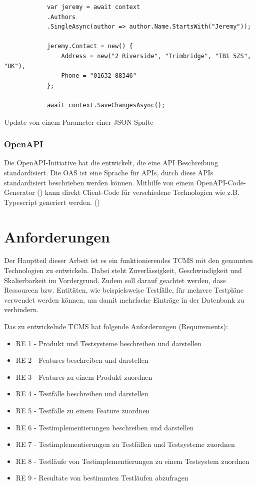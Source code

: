 \documentclass[a4paper, fontsize=11pt, parskip=half, twoside]{scrreprt}
\begin{document}
	\begin{listing}[ht]
		\begin{verbatim}
			var jeremy = await context
			.Authors
			.SingleAsync(author => author.Name.StartsWith("Jeremy"));
			
			jeremy.Contact = new() { 
				Address = new("2 Riverside", "Trimbridge", "TB1 5ZS", "UK"), 
				Phone = "01632 88346" 
			};
		
			await context.SaveChangesAsync();
		\end{verbatim}
		\caption{Update von einem Parameter einer \ac{JSON} Spalte}
		\label{lst:exampleOfJsonColumn}
	\end{listing}
	
	\subsection{OpenAPI}
	Die OpenAPI-Initiative hat die  entwickelt, die eine \ac{API} Beschreibung standardisiert.
	Die \ac{OAS} ist eine Sprache für  \ac{API}s, durch diese \ac{API}s standardisiert beschrieben werden können. 
	Mithilfe von einem OpenAPI-Code-Generator (\textcite{noauthor_openapi_nodate-1}) kann direkt Client-Code für verschiedene Technologien wie z.B. Typescript generiert werden. (\textcite{noauthor_openapi_nodate})
	
	
	
	\chapter{Anforderungen} \label{chapter:requiremnts}
	Der Hauptteil dieser Arbeit ist es ein funktionierendes \ac{TCMS} mit den genannten Technologien zu entwickeln.
	Dabei steht Zuverlässigkeit, Geschwindigkeit und Skalierbarkeit im Vordergrund.
	Zudem soll darauf geachtet werden, dass Ressourcen bzw. Entitäten, wie beispielsweise Testfälle, für mehrere Testpläne verwendet werden können, um damit mehrfache Einträge in der Datenbank zu verhindern.
	
	Das zu entwickelnde \ac{TCMS} hat folgende Anforderungen (Requirements):
	
	\begin{itemize}
		\setlength\itemsep{-0.5em}
		\item RE 1 - Produkt und Testsysteme beschreiben und darstellen
		\item RE 2 - Features beschreiben und darstellen
		\item RE 3 - Features zu einem Produkt zuordnen
		\item RE 4 - Testfälle beschreiben und darstellen
		\item RE 5 - Testfälle zu einem Feature zuordnen
		\item RE 6 - Testimplementierungen beschreiben und darstellen
		\item RE 7 - Testimplementierungen zu Testfällen und Testsysteme zuordnen
		\item RE 8 - Testläufe von Testimplementierungen zu einem Testsystem zuordnen
		\item RE 9 - Resultate von bestimmten Testläufen abzufragen
	\end{itemize}
	
\end{document}
